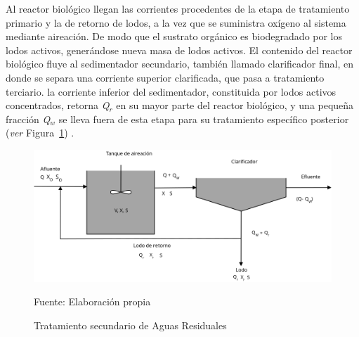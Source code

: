Al reactor biológico llegan las corrientes procedentes de la etapa de tratamiento primario y la de retorno de lodos, a la vez que se suministra oxígeno al sistema mediante aireación. De modo que el sustrato orgánico es biodegradado por los lodos activos, generándose nueva masa de lodos activos. El contenido del reactor biológico fluye al sedimentador secundario, también llamado clarificador final, en donde se separa una corriente superior clarificada, que pasa a tratamiento terciario. la corriente inferior del sedimentador, constituida por lodos activos concentrados, retorna \emph{Q$_{r}$} en su mayor parte del reactor biológico, y una pequeña fracción \emph{Q$_{w}$} se lleva fuera de esta etapa para su tratamiento específico posterior (\emph{ver} Figura~\ref{fig:balance}) \emph{\citep{manuel13}}.\\
	\begin{figure}[!h]
		\centering
		\includegraphics[scale=0.25]{Diagrama_de_flujo.png}
		\caption{Tratamiento secundario de Aguas Residuales}
		\small{Fuente: Elaboración propia}
		\label{fig:balance}
	\end{figure}

